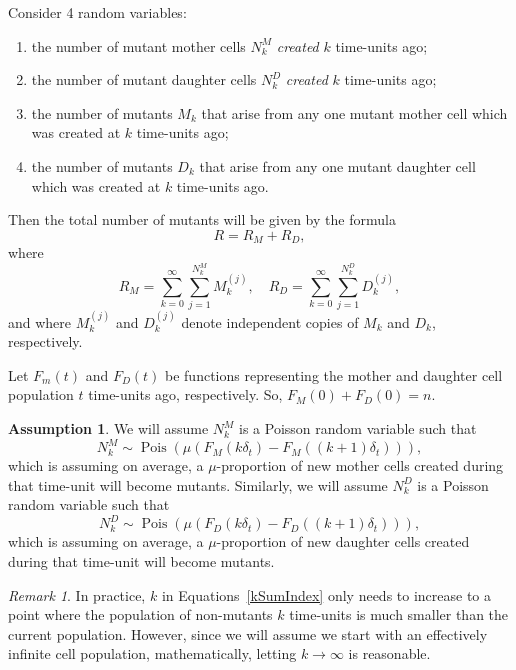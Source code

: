 \documentclass[12pt]{amsart}
\theoremstyle{plain}
\theoremstyle{definition}
\theoremstyle{remark}
\newtheorem*{rem}{Remark}
\theoremstyle{definition}
\newtheorem{assume}[thm]{Assumption}
\begin{document}
Consider 4 random variables:
\begin{enumerate}
\item the number of mutant mother cells $N^M_k$ \emph{created} $k$ time-units ago;
\item the number of mutant daughter cells $N^D_k$ \emph{created} $k$ time-units ago;
\item the number of mutants $M_k$ that arise from any one mutant mother cell which was created at $k$ time-units ago;
\item the number of mutants $D_k$ that arise from any one mutant daughter cell which was created at $k$ time-units ago.
\end{enumerate}
Then the total number of mutants will be given by the formula
\begin{equation}
R = R_M + R_D,
\end{equation}
where
\begin{equation}
R_M = \sum_{k=0}^\infty \sum_{j=1}^{N^M_k} M^{(j)}_k, \quad
R_D = \sum_{k=0}^\infty \sum_{j=1}^{N^D_k} D^{(j)}_k, \label{kSumIndex}
\end{equation}
and where $M^{(j)}_k$ and $D^{(j)}_k$ denote independent copies of $M_k$ and $D_k$, respectively. 

Let $F_m(t)$ and $F_D(t)$ be functions representing the mother and daughter cell population $t$ time-units ago, respectively. So, $F_M(0) + F_D(0) = n$.

\begin{assume} \label{multiPoisson}
We will assume $N^M_k$ is a Poisson random variable such that
\begin{equation}
N^M_k \sim \operatorname{Pois}\left(\mu \left( F_M(k\delta_t)-F_M((k+1)\delta_t) \right) \right),
\end{equation}
which is assuming on average, a $\mu$-proportion of new mother cells created during that time-unit will become mutants. Similarly, we will assume $N^D_k$ is a Poisson random variable such that
\begin{equation}
N^D_k \sim \operatorname{Pois}\left(\mu \left( F_D(k\delta_t)-F_D((k+1)\delta_t) \right) \right),
\end{equation}
which is assuming on average, a $\mu$-proportion of new daughter cells created during that time-unit will become mutants.
\end{assume}

\begin{rem}
In practice, $k$ in Equations~\eqref{kSumIndex} only needs to increase to a point where the population of non-mutants $k$ time-units is much smaller than the current population. However, since we will assume we start with an effectively infinite cell population, mathematically, letting $k \to \infty$ is reasonable.
\end{rem}
\end{document}
